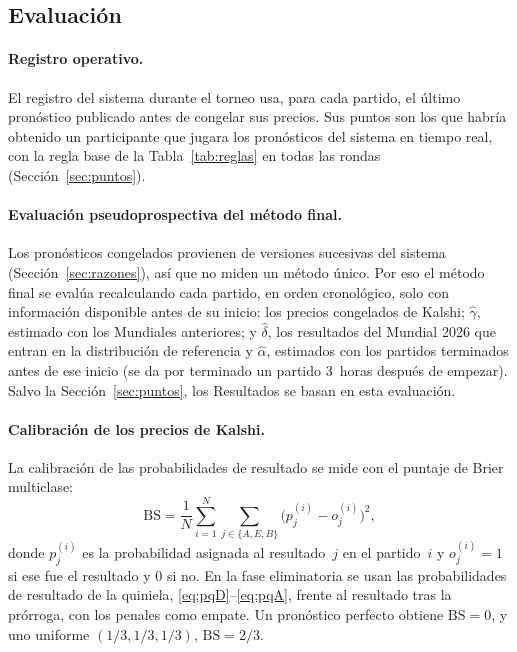 \documentclass[12pt]{article}
\theoremstyle{plain}
\theoremstyle{remark}
\begin{document}
\subsection{Evaluación}
\label{sec:metricas}

\paragraph{Registro operativo.}
El registro del sistema durante el torneo usa, para cada partido, el
último pronóstico publicado antes de congelar sus precios.
Sus puntos son los que habría obtenido un participante que jugara los
pronósticos del sistema en tiempo real, con la regla base de la
Tabla~\ref{tab:reglas} en todas las rondas
(Sección~\ref{sec:puntos}).

\paragraph{Evaluación pseudoprospectiva del método final.}
Los pronósticos congelados provienen de versiones sucesivas del
sistema (Sección~\ref{sec:razones}), así que no miden un método único.
Por eso el método final se evalúa recalculando cada partido, en orden
cronológico, solo con información disponible antes de su inicio: los
precios congelados de Kalshi; $\hat\gamma$, estimado con los Mundiales
anteriores; y $\hat\delta$, los resultados del Mundial 2026 que entran
en la distribución de referencia y $\hat\alpha$, estimados con los
partidos terminados antes de ese inicio (se da por terminado un
partido 3~horas después de empezar).
Salvo la Sección~\ref{sec:puntos}, los Resultados se basan en esta
evaluación.

\paragraph{Calibración de los precios de Kalshi.}
La calibración de las probabilidades de resultado se mide con el
puntaje de Brier multiclase:
\begin{equation}
  \mathrm{BS}
  = \frac{1}{N}\sum_{i=1}^{N} \sum_{j \in \{A, E, B\}}
    \bigl(p_j^{(i)} - o_j^{(i)}\bigr)^2,
  \label{eq:brier}
\end{equation}
donde $p_j^{(i)}$ es la probabilidad asignada al resultado~$j$ en el
partido~$i$ y $o_j^{(i)} = 1$ si ese fue el resultado y 0 si no.
En la fase eliminatoria se usan las probabilidades de resultado de la
quiniela, \eqref{eq:pqD}--\eqref{eq:pqA}, frente al resultado tras la
prórroga, con los penales como empate.
Un pronóstico perfecto obtiene $\mathrm{BS} = 0$, y uno uniforme
$(1/3, 1/3, 1/3)$, $\mathrm{BS} = 2/3$.
\end{document}
